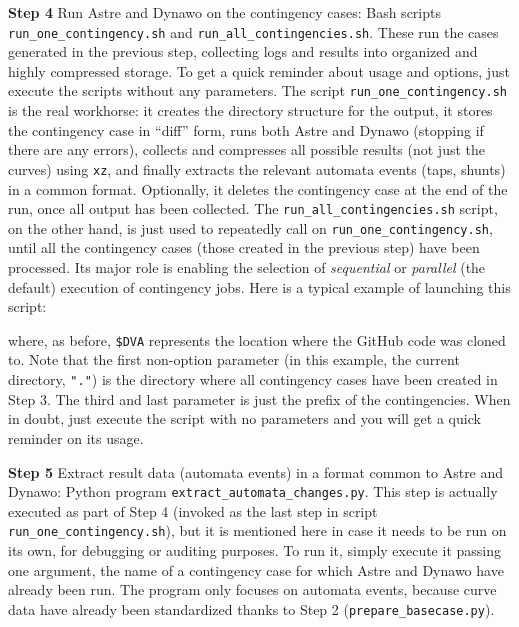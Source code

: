 \documentclass[11pt, a4paper, twoside, titlepage]{article}
\newcommand{\code}[1]{\texttt{#1}}
\begin{document}
\noindent\textbf{Step 4} Run Astre and Dynawo on the contingency
cases: Bash scripts \code{run\_one\_contingency.sh} and
\code{run\_all\_contingencies.sh}. These run the cases generated in
the previous step, collecting logs and results into organized and
highly compressed storage. To get a quick reminder about usage and
options, just execute the scripts without any parameters. The script
\code{run\_one\_contingency.sh} is the real workhorse: it creates the
directory structure for the output, it stores the contingency case in
``diff'' form, runs both Astre and Dynawo (stopping if there are any
errors), collects and compresses all possible results (not just the
curves) using \code{xz}, and finally extracts the relevant automata
events (taps, shunts) in a common format. Optionally, it deletes the
contingency case at the end of the run, once all output has been
collected. The \code{run\_all\_contingencies.sh} script, on the other
hand, is just used to repeatedly call on
\code{run\_one\_contingency.sh}, until all the contingency cases
(those created in the previous step) have been processed. Its major
role is enabling the selection of \emph{sequential} or \emph{parallel}
(the default) execution of contingency jobs. Here is a typical example
of launching this script:
where, as before, \code{\$DVA} represents the location where the
GitHub code was cloned to. Note that the first non-option parameter
(in this example, the current directory, \code{"."}) is the directory
where all contingency cases have been created in Step 3. The third and
last parameter is just the prefix of the contingencies.  When in
doubt, just execute the script with no parameters and you will get a
quick reminder on its usage.

\noindent\textbf{Step 5} Extract result data (automata events) in a
format common to Astre and Dynawo: Python program
\code{extract\_automata\_changes.py}.  This step is actually executed
as part of Step 4 (invoked as the last step in script
\code{run\_one\_contingency.sh}), but it is mentioned here in case it
needs to be run on its own, for debugging or auditing purposes. To run
it, simply execute it passing one argument, the name of a contingency case for
which Astre and Dynawo have already been run. The program only focuses
on automata events, because curve data have already been standardized
thanks to Step 2 (\code{prepare\_basecase.py}).
\end{document}

